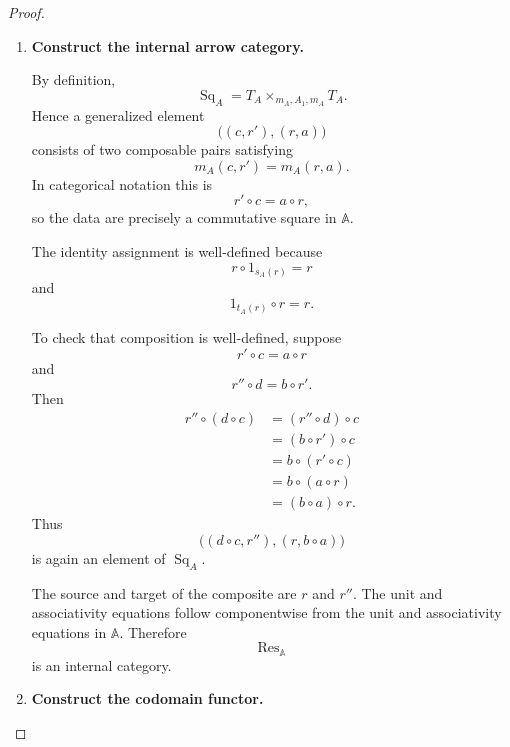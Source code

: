 \begin{proof}
    \leavevmode
    \begin{enumerate}
        \item \textbf{Construct the internal arrow category.}

        By definition,
        \[
            \operatorname{Sq}_A
            =
            T_A\times_{m_A,A_1,m_A}T_A.
        \]
        Hence a generalized element
        \[
            \bigl((c,r'),(r,a)\bigr)
        \]
        consists of two composable pairs satisfying
        \[
            m_A(c,r')=m_A(r,a).
        \]
        In categorical notation this is
        \[
            r'\circ c=a\circ r,
        \]
        so the data are precisely a commutative square in
        \(\mathbb A\).

        The identity assignment is well-defined because
        \[
            r\circ1_{s_A(r)}=r
        \]
        and
        \[
            1_{t_A(r)}\circ r=r.
        \]

        To check that composition is well-defined, suppose
        \[
            r'\circ c=a\circ r
        \]
        and
        \[
            r''\circ d=b\circ r'.
        \]
        Then
        \[
            \begin{aligned}
                r''\circ(d\circ c)
                &=
                (r''\circ d)\circ c
                \\
                &=
                (b\circ r')\circ c
                \\
                &=
                b\circ(r'\circ c)
                \\
                &=
                b\circ(a\circ r)
                \\
                &=
                (b\circ a)\circ r.
            \end{aligned}
        \]
        Thus
        \[
            \bigl(
                (d\circ c,r''),
                (r,b\circ a)
            \bigr)
        \]
        is again an element of \(\operatorname{Sq}_A\).

        The source and target of the composite are \(r\) and \(r''\).
        The unit and associativity equations follow componentwise from the
        unit and associativity equations in \(\mathbb A\). Therefore
        \[
            \operatorname{Res}_{\mathbb A}
        \]
        is an internal category.

        \item \textbf{Construct the codomain functor.}


\end{enumerate}
\end{proof}

